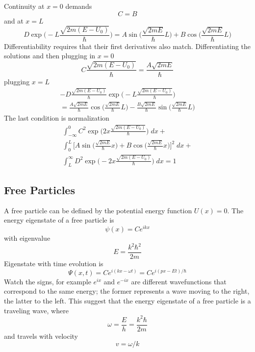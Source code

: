 \documentclass[../../../main.tex]{subfiles}
\begin{document}
Continuity at $x=0$ demands
\begin{equation*}
    C=B
\end{equation*}
and at $x=L$
\begin{equation*}
    D\exp\biggl( -L{\frac{\sqrt{2m(E-U_0)}}{\hbar}} \biggr)=A\sin \biggl(\frac{\sqrt{2mE}}{\hbar} L\biggr)+ B \cos \biggl(\frac{\sqrt{2mE}}{\hbar} L\biggr)
\end{equation*}
Differentiability requires that their first derivatives also match. Differentiating the solutions and then plugging in $x=0$
\begin{equation*}
    C\frac{\sqrt{2m(E-U_0)}}{\hbar}=\frac{A\sqrt{2mE}}{\hbar}
\end{equation*}
plugging $x=L$
\begin{multline*}
    -D{\frac{\sqrt{2m(E-U_0)}}{\hbar}}\exp\biggl( -L{\frac{\sqrt{2m(E-U_0)}}{\hbar}} \biggr)\\=  \frac{A\sqrt{2mE}}{\hbar} \cos \biggl(\frac{\sqrt{2mE}}{\hbar} L\biggr)-\frac{B\sqrt{2mE}}{\hbar} \sin \biggl(\frac{\sqrt{2mE}}{\hbar} L\biggr)
\end{multline*}
The last condition is normalization
\begin{multline*}
    \int_{-\infty}^{0}C^2\exp\biggl( 2x{\frac{\sqrt{2m(E-U_0)}}{\hbar}} \biggr)\;dx+\\ \int_{0}^{L}\biggl[ A\sin \biggl(\frac{\sqrt{2mE}}{\hbar} x\biggr)+ B \cos \biggl(\frac{\sqrt{2mE}}{\hbar} x\biggr) \biggr]^2\;dx + \\ \int_{L}^{\infty} D^2\exp\biggl( -2x{\frac{\sqrt{2m(E-U_0)}}{\hbar}} \biggr)\;dx=1
\end{multline*}

\subsection{Free Particles}
A free particle can be defined by the potential energy function $U(x) = 0$. The energy eigenstate of a free particle is
\begin{equation*}
    \psi(x) = Ce^{ikx}
\end{equation*}
with eigenvalue
\begin{equation*}
    E=\frac{k^2\hbar^2}{2m}
\end{equation*}
Eigenstate with time evolution is
\begin{equation*}
    \Psi(x,t)=Ce^{i(kx-\omega t)} = Ce^{i(px-Et)/\hbar}
\end{equation*}
Watch the signs, for example $e^{ix}$ and $e^{-ix}$ are different wavefunctions that correspond to the same energy; the former represents a wave moving to the right, the latter to the left. This suggest that the energy eigenstate of a free particle is a traveling wave, where
\begin{equation*}
    \omega=\frac{E}{h}=\frac{k^2\hbar}{2m}
\end{equation*} 
and travels with velocity \begin{equation*}
    v=\omega/k
\end{equation*}
\end{document}
